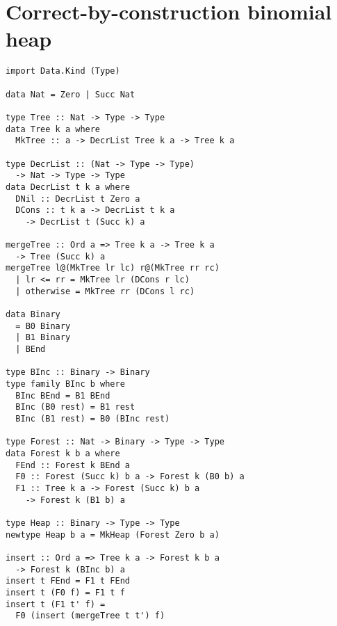 \documentclass[sigplan,screen]{acmart}
\begin{document}




\appendix

\section{Correct-by-construction binomial heap}\label{app:datakinds}

\begin{lstlisting}
import Data.Kind (Type)

data Nat = Zero | Succ Nat

type Tree :: Nat -> Type -> Type
data Tree k a where
  MkTree :: a -> DecrList Tree k a -> Tree k a

type DecrList :: (Nat -> Type -> Type)
  -> Nat -> Type -> Type
data DecrList t k a where
  DNil :: DecrList t Zero a
  DCons :: t k a -> DecrList t k a
    -> DecrList t (Succ k) a

mergeTree :: Ord a => Tree k a -> Tree k a
  -> Tree (Succ k) a
mergeTree l@(MkTree lr lc) r@(MkTree rr rc)
  | lr <= rr = MkTree lr (DCons r lc)
  | otherwise = MkTree rr (DCons l rc)

data Binary
  = B0 Binary
  | B1 Binary
  | BEnd

type BInc :: Binary -> Binary
type family BInc b where
  BInc BEnd = B1 BEnd
  BInc (B0 rest) = B1 rest
  BInc (B1 rest) = B0 (BInc rest)

type Forest :: Nat -> Binary -> Type -> Type
data Forest k b a where
  FEnd :: Forest k BEnd a
  F0 :: Forest (Succ k) b a -> Forest k (B0 b) a
  F1 :: Tree k a -> Forest (Succ k) b a
    -> Forest k (B1 b) a

type Heap :: Binary -> Type -> Type
newtype Heap b a = MkHeap (Forest Zero b a)

insert :: Ord a => Tree k a -> Forest k b a
  -> Forest k (BInc b) a
insert t FEnd = F1 t FEnd
insert t (F0 f) = F1 t f
insert t (F1 t' f) =
  F0 (insert (mergeTree t t') f)
\end{lstlisting}
\end{document}
